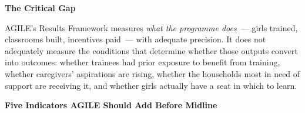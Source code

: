 \documentclass[11pt,landscape,letterpaper]{article}
\begin{document}
\newpage
\thispagestyle{fancy}

\vspace*{0.2cm}
{\color{navy}\fontsize{26}{32}\selectfont\bfseries The Critical Gap}

\vspace{0.5cm}

\begin{minipage}{0.96\textwidth}
  \color{navy}\fontsize{13}{19}\selectfont
  AGILE's Results Framework measures \textit{what the programme does}~---
  girls trained, classrooms built, incentives paid~--- with adequate
  precision. It does not adequately measure the conditions that determine
  whether those outputs convert into outcomes: whether trainees had prior
  exposure to benefit from training, whether caregivers' aspirations are
  rising, whether the households most in need of support are receiving it,
  and whether girls actually have a seat in which to learn.
\end{minipage}

\vspace{1.1cm}
{\color{navy}\fontsize{17}{22}\selectfont\bfseries
Five Indicators AGILE Should Add Before Midline}

\vspace{0.5cm}
\end{document}
